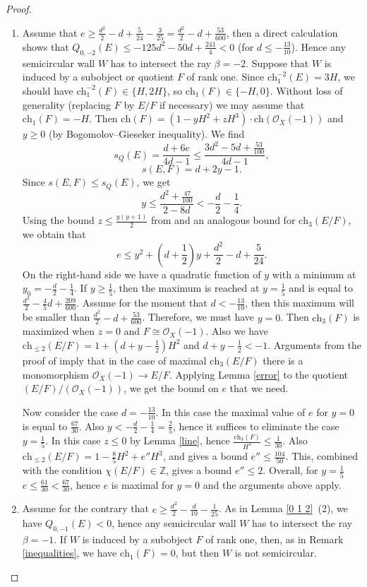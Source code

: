 \documentclass{amsart}
\begin{document}
	\begin{proof}
		\begin{enumerate}
			\item Assume that $e\ge\frac{d^2}{2}-d+\frac{5}{24}-\frac{3}{25}=\frac{d^2}{2}-d+\frac{53}{600}$, then a direct calculation shows that $Q_{0,-2}(E)\le -125d^2-50d+\frac{241}{4}<0$ (for $d\le -\frac{13}{10}$). Hence any semicircular wall $W$ has to intersect the ray $\beta=-2$. Suppose that $W$ is induced by a subobject or quotient $F$ of rank one. Since $\mathrm{ch}_1^{-2}(E)=3H$, we should have $\mathrm{ch}_1^{-2}(F)\in\{H,2H\}$, so $\mathrm{ch}_1(F)\in\{-H,0\}$. Without loss of generality (replacing $F$ by $E/F$ if necessary) we may assume that $\mathrm{ch}_1(F)=-H$. Then $\mathrm{ch}(F)=(1-yH^2+zH^3)\cdot\mathrm{ch}(\mathcal O_X(-1))$ and $y\ge 0$ (by Bogomolov--Gieseker inequality). We find
			$$s_Q(E)=\frac{d+6e}{4d-1}\le\frac{3d^2-5d+\frac{53}{100}}{4d-1},$$
			$$s(E,F)=d+2y-1.$$
			Since $s(E,F)\le s_Q(E)$, we get
			$$y\le\frac{d^2+\frac{47}{100}}{2-8d}<-\frac d2-\frac 14.$$
			Using the bound $z\le\frac{y(y+1)}{2}$ from \cite[Lemma 4.2]{Vass} and an analogous bound for $\mathrm{ch}_3(E/F)$, we obtain that
			$$e\le y^2+\left(d+\frac 12\right)y+\frac{d^2}{2}-d+\frac{5}{24}.$$
			On the right-hand side we have a quadratic function of $y$ with a minimum at $y_0=-\frac d2-\frac 14$. If $y\ge\frac 15$, then the maximum is reached at $y=\frac 15$ and is equal to $\frac{d^2}{2}-\frac 45d+\frac{209}{600}$. Assume for the moment that $d<-\frac{13}{10}$, then this maximum will be smaller than $\frac{d^2}{2}-d+\frac{53}{600}$. Therefore, we must have $y=0$. Then $\mathrm{ch}_3(F)$ is maximized when $z=0$ and $F\cong\mathcal O_X(-1)$. Also we have $\mathrm{ch}_{\le 2}(E/F)=1+(d+y-\frac 12)H^2$ and $d+y-\frac 12<-1$. Arguments from the proof of \cite[Proposition 3.2]{MS18} imply that in the case of maximal $\mathrm{ch}_3(E/F)$ there is a monomorphism $\mathcal O_X(-1)\to E/F$. Applying Lemma \ref{error} to the quotient $(E/F)/(\mathcal O_X(-1))$, we get the bound on $e$ that we need.
			
			Now consider the case $d=-\frac{13}{10}$. In this case the maximal value of $e$ for $y=0$ is equal to $\frac{67}{30}$. Also $y<-\frac d2-\frac 14=\frac 25$, hence it suffices to eliminate the case $y=\frac 15$. In this case $z\le 0$ by Lemma \ref{line}, hence $\frac{\mathrm{ch}_3(F)}{H^3}\le\frac{1}{30}$. Also $\mathrm{ch}_{\le 2}(E/F)=1-\frac 85H^2+e''H^3$, and \cite[Lemma 4.2]{Vass} gives a bound $e''\le\frac{104}{50}$. This, combined with the condition $\chi(E/F)\in\mathbb Z$, gives a bound $e''\le 2$. Overall, for $y=\frac 15$ $e\le\frac{61}{30}<\frac{67}{30}$, hence $e$ is maximal for $y=0$ and the arguments above apply.
			\item Assume for the contrary that $e\ge\frac{d^2}{2}-\frac{d}{10}-\frac{1}{25}$. As in Lemma \ref{0 1 2}~(2), we have $Q_{0,-1}(E)<0$, hence any semicircular wall $W$ has to intersect the ray $\beta=-1$. If $W$ is induced by a subobject $F$ of rank one, then, as in Remark \ref{inequalities}, we have $\mathrm{ch}_1(F)=0$, but then $W$ is not semicircular.
		\end{enumerate}
	\end{proof}
	
\end{document}

